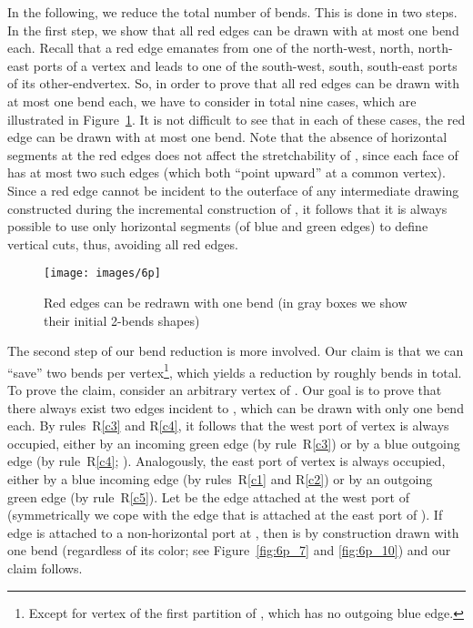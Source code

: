 \documentclass[a4paper,twoside,11pt]{article}
\begin{document}
In the following, we reduce the total number of bends. This is done
in two steps. In the first step, we show that all red edges can be
drawn with at most one bend each. Recall that a red edge emanates
from one of the north-west, north, north-east ports of a vertex and
leads to one of the south-west, south, south-east ports of its
other-endvertex. So, in order to prove that all red edges can be
drawn with at most one bend each, we have to consider in total nine
cases, which are illustrated in Figure~\ref{fig:rededges}. It is not
difficult to see that in each of these cases, the red edge can be
drawn with at most one bend. Note that the absence of horizontal
segments at the red edges does not affect the stretchability of
, since each face of  has at most two such
edges (which both ``point upward'' at a common vertex). Since a red
edge cannot be incident to the outerface of any intermediate drawing
constructed during the incremental construction of , it
follows that it is always possible to use only horizontal segments
(of blue and green edges) to define vertical cuts, thus, avoiding all
red edges.

\begin{figure}[t!]
    \centering
    \texttt{[image: images/6p]} 
    \caption{Red edges can be redrawn with one bend (in gray boxes we show their initial 2-bends shapes)}
    \label{fig:rededges}  
\end{figure} 

The second step of our bend reduction is more involved. Our claim is
that we can ``save'' two bends per vertex\footnote{Except for vertex
 of the first partition  of , which has no outgoing
blue edge.}, which yields a reduction by roughly  bends in
total. To prove the claim, consider an arbitrary vertex  of
. Our goal is to prove that there always exist two edges incident
to , which can be drawn with only one bend each. By
rules~R\ref{c3} and R\ref{c4}, it follows that the west port of
vertex  is always occupied, either by an incoming green edge (by
rule~R\ref{c3}) or by a blue outgoing edge (by rule~R\ref{c4}; ). Analogously, the east port of vertex  is
always occupied, either by a blue incoming edge (by rules~R\ref{c1}
and R\ref{c2}) or by an outgoing green edge (by rule~R\ref{c5}). Let
 be the edge attached at the west port of 
(symmetrically we cope with the edge that is attached at the east
port of ). If edge  is attached to a non-horizontal port
at , then  is by construction drawn with one bend
(regardless of its color; see Figure~\ref{fig:6p_7} and
\ref{fig:6p_10}) and our claim follows.
\end{document}
